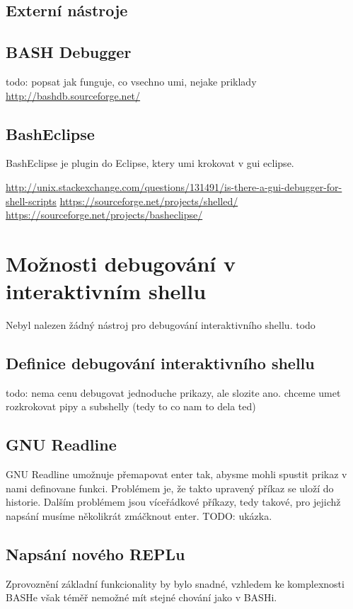 \documentclass[thesis=M,czech]{FITthesis}[2012/06/26]
\begin{document}
\subsection{Externí nástroje}

\subsection{BASH Debugger}
todo: popsat jak funguje, co vsechno umi, nejake priklady
\url{http://bashdb.sourceforge.net/}


\subsection{BashEclipse}
BashEclipse je plugin do Eclipse, ktery umi krokovat v gui eclipse.

\url{http://unix.stackexchange.com/questions/131491/is-there-a-gui-debugger-for-shell-scripts}
\url{https://sourceforge.net/projects/shelled/}
\url{https://sourceforge.net/projects/basheclipse/}

%
%
%
%
%
\section{Možnosti debugování v interaktivním shellu}

Nebyl nalezen žádný nástroj pro debugování interaktivního shellu. todo

\subsection{Definice debugování interaktivního shellu}
todo: nema cenu debugovat jednoduche prikazy, ale slozite ano. chceme umet rozkrokovat pipy a subshelly (tedy to co nam to dela ted)



\subsection{GNU Readline}
GNU Readline umožnuje přemapovat enter tak, abysme mohli spustit prikaz v nami definovane funkci. Problémem je, že takto upravený příkaz se uloží do historie. Dalším problémem jsou víceřádkové příkazy, tedy takové, pro jejichž napsání musíme několikrát zmáčknout enter.
TODO: ukázka.

\subsection{Napsání nového REPLu}
Zprovoznění základní funkcionality by bylo snadné, vzhledem ke komplexnosti BASHe však téměř nemožné mít stejné chování jako v BASHi.
\end{document}
